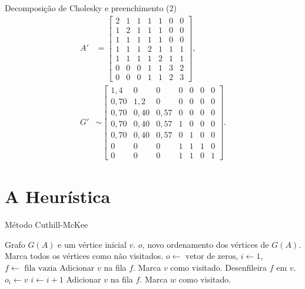 \documentclass[10pt]{beamer}
\begin{document}
\begin{frame}{Decomposição de Cholesky e preenchimento (2)}
  \begin{align*}
      A' &= \begin{bmatrix}
          2 & 1 & 1 & 1 & 1 & 0 & 0 \\
          1 & 2 & 1 & 1 & 1 & 0 & 0 \\
          1 & 1 & 1 & 1 & 1 & 0 & 0 \\
          1 & 1 & 1 & 2 & 1 & 1 & 1 \\
          1 & 1 & 1 & 1 & 2 & 1 & 1 \\
          0 & 0 & 0 & 1 & 1 & 3 & 2 \\
          0 & 0 & 0 & 1 & 1 & 2 & 3
      \end{bmatrix}, \\
      G' &\sim \begin{bmatrix}
          1,4 & 0 & 0 & 0 & 0 & 0 & 0 \\
          0,70 & 1,2 & 0 & 0 & 0 & 0 & 0 \\
          0,70 & 0,40 & 0,57 & 0 & 0 & 0 & 0 \\
          0,70 & 0,40 & 0,57 & 1 & 0 & 0 & 0 \\
          0,70 & 0,40 & 0,57 & 0 & 1 & 0 & 0 \\
          0 & 0 & 0 & 1 & 1 & 1 & 0 \\
          0 & 0 & 0 & 1 & 1 & 0 & 1
      \end{bmatrix}.
  \end{align*}
\end{frame}

\section{A Heurística}
\begin{frame}[fragile]{Método Cuthill-McKee}
  \begin{algorithmic}[1]
      \REQUIRE Grafo $G(A)$ e um vértice inicial $v$.
      \ENSURE $o$, novo ordenamento dos vértices de $G(A)$.
      \STATE Marca todos os vértices como não visitados.
      \STATE $o \longleftarrow \text{ vetor de zeros}$, $i \longleftarrow
      1$, $f \longleftarrow \text{ fila vazia}$
      \STATE Adicionar $v$ na fila $f$.
      \STATE Marca $v$ como visitado.
          \STATE Desenfileira $f$ em $v$.
          \STATE $o_i \longleftarrow v$
          \STATE $i \longleftarrow i + 1$
                  \STATE Adicionar $v$ na fila $f$.
                  \STATE Marca $w$ como visitado.
              \ENDIF
          \ENDFOR
      \ENDWHILE
  \end{algorithmic}
\end{frame}
\end{document}
